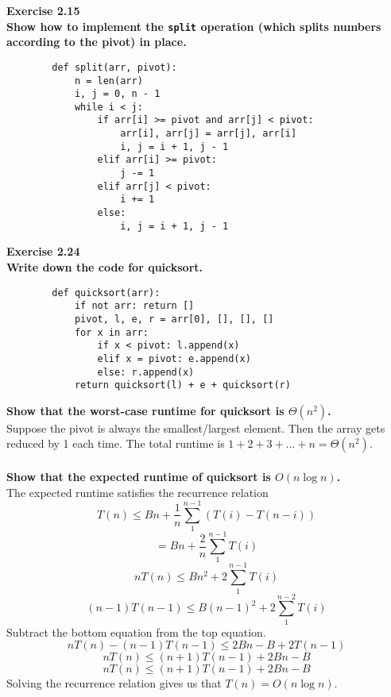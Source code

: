 \documentclass{article}
\newenvironment{problem}[2][Exercise]
    { \begin{mdframed}[backgroundcolor=gray!20] \textbf{#1 #2} \\}
    {  \end{mdframed}}
\begin{document}
\begin{problem}{2.15}
\textbf{Show how to implement the \texttt{split} operation (which splits numbers according to the pivot) in place.}
    \begin{lstlisting}
        def split(arr, pivot):
            n = len(arr)
            i, j = 0, n - 1
            while i < j:
                if arr[i] >= pivot and arr[j] < pivot:
                    arr[i], arr[j] = arr[j], arr[i]
                    i, j = i + 1, j - 1
                elif arr[i] >= pivot:
                    j -= 1
                elif arr[j] < pivot:
                    i += 1
                else:
                    i, j = i + 1, j - 1
    \end{lstlisting}
\end{problem}

\begin{problem}{2.24}
    \textbf{Write down the code for quicksort.}
     \begin{lstlisting}
        def quicksort(arr):
            if not arr: return []
            pivot, l, e, r = arr[0], [], [], []
            for x in arr:
                if x < pivot: l.append(x)
                elif x = pivot: e.append(x)
                else: r.append(x)
            return quicksort(l) + e + quicksort(r)
    \end{lstlisting}
    \textbf{Show that the worst-case runtime for quicksort is $\Theta(n^2)$.}
    \\
    Suppose the pivot is always the smallest/largest element. Then the array gets reduced by 1 each time. The total runtime is $1 + 2 + 3 + ... + n = \Theta(n^2)$.
    \\ \\
    \textbf{Show that the expected runtime of quicksort is $O(n \log n)$.}
    \\
    The expected runtime satisfies the recurrence relation
    \[
        T(n) \leq Bn + \frac{1}{n}\sum_{1}^{n - 1} (T(i) - T(n - i))
    \]
    \[
        = Bn + \frac{2}{n}\sum_{1}^{n - 1} T(i)
    \]
    \[
        nT(n) \leq Bn^2 + 2\sum_{1}^{n - 1} T(i)
    \]
    \[
        (n - 1)T(n - 1) \leq B(n - 1)^2 + 2\sum_{1}^{n - 2} T(i)
    \]
    Subtract the bottom equation from the top equation.
    \[
        nT(n) - (n - 1)T(n - 1) \leq 2Bn - B + 2T(n - 1)
    \]
    \[
        nT(n) \leq (n + 1)T(n - 1) + 2Bn - B
    \]
    \[
        nT(n) \leq (n + 1)T(n - 1) + 2Bn - B
    \]
    Solving the recurrence relation gives us that $T(n) = O(n \log n)$.
\end{problem}
\end{document}
